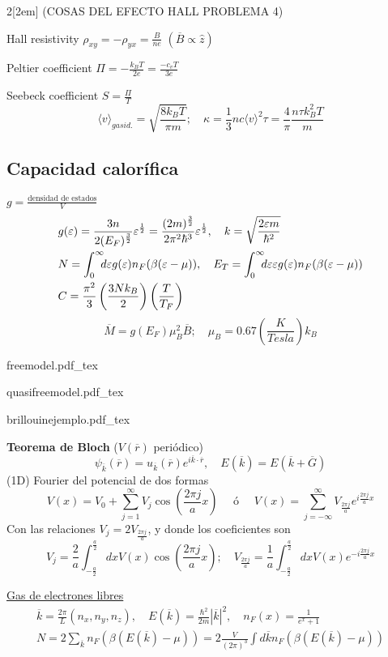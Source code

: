 \documentclass[leqno]{article}
\newcommand{\incfig}[1]{%
\begin{center}
\def\svgwidth{0.9\columnwidth}
{#1.pdf_tex}
\end{center}
}
\begin{document}
\begin{multicols}{2}[\columnsep2em]
(COSAS DEL EFECTO HALL PROBLEMA 4)

Hall resistivity $\rho _{xy}=-\rho_{yx} = \frac{B}{ne}$ $(\overline{B}\propto \hat{z} )$

Peltier coefficient $\Pi = -\frac{k_BT}{2e}= \frac{-c_vT}{3e}$

Seebeck coefficient $S = \frac{\Pi}{T}$
\[
  \langle v\rangle_{gas id.} = \sqrt{\frac{8k_BT}{\pi m}} ; \quad \kappa = \frac{1}{3} nc\langle v\rangle ^2\tau = \frac{4}{\pi }\frac{n\tau k_B^2T}{m}
\] 
\subsection{Capacidad calorífica}
$g = \frac{\text{densidad de estados}}{V}$
\begin{align*}
  &g(\varepsilon ) = \frac{3n}{2(E_F)^{\frac{3}{2}}}\varepsilon ^{\frac{1}{2}} = \frac{(2m)^{\frac{3}{2}}}{2\pi ^2\hbar ^3}\varepsilon ^{\frac{1}{2}} , \quad k = \sqrt{\frac{2\varepsilon m}{\hbar ^2}}  \\
  & N = \int_0^\infty \hspace{-0.5em} d\varepsilon g(\varepsilon )n_F(\beta (\varepsilon -\mu )), \quad
  E_T = \int_0^\infty \hspace{-0.5em} d\varepsilon \varepsilon g(\varepsilon )n_F(\beta (\varepsilon -\mu ))\\
  & C = \frac{\pi ^2}{3}\left( \frac{3Nk_B}{2} \right) \left( \frac{T}{T_F} \right) 
\end{align*}
\[
\overline{M} = g(E_F)\mu _B^2 \overline{B}; \quad \mu _B = 0.67 \left( \frac{K}{Tesla} \right) k_B
\] 
\incfig{freemodel}
\incfig{quasifreemodel}
\incfig{brillouinejemplo}

\textbf{Teorema de Bloch} ($V(\overline{r})$ periódico)
\[
  \psi _{\overline{k}} (\overline{r}) = u_{\overline{k}}(\overline{r})e^{i \overline{k}\cdot \overline{r}}, \quad E(\overline{k}) = E(\overline{k}+\overline{G})
\] 
(1D) Fourier del potencial de dos formas
\[
V(x)=V_0 + \sum _{j=1}^\infty V_j\cos\left( \frac{2\pi j}{a}x \right)  \quad \text{ ó } \quad 
V(x)=\sum_{j=-\infty}^\infty V_{\frac{2\pi j}{a}} e ^{i\frac{2\pi j}{a}x}
\]
Con las relaciones $V_j = 2 V_{\frac{2\pi j}{a}}$, y donde los coeficientes son
\[
  V_j = \frac{2}{a} \int _{-\frac{a}{2}} ^{\frac{a}{2}} dx V(x)\cos\left( \frac{2\pi j}{a}x \right); \quad
  V_{\frac{2\pi j}{a}} = \frac{1}{a} \int _{-\frac{a}{2}} ^{\frac{a}{2}} dx V(x)e ^{-i\frac{2\pi j }{a}x}
\]

\underline{Gas de electrones libres}
\begin{align*}
\overline{k}=\frac{2\pi}{L}(n_x, n_y, n_z), \quad E(\overline{k})=\frac{\hbar ^2}{2m}|\overline{k}|^2, \quad n_F(x)=\frac{1}{e^x+1}\\
N = 2\sum_{\overline{k}} n_F(\beta(E(\overline{k})- \mu)) = 2 \frac{V}{(2\pi)^3}\int d \overline{k}n_F(\beta (E( \overline{k})-\mu))
\end{align*}


\end{multicols}
\end{document}
